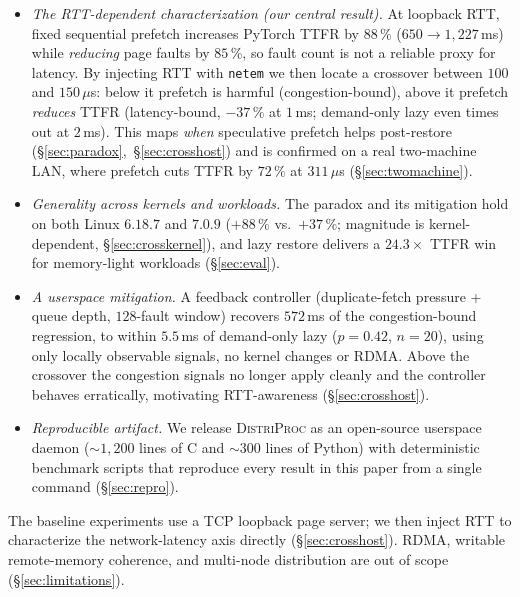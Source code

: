 \documentclass[journal]{IEEEtran}
\newcommand{\distriproc}{\textsc{DistriProc}\xspace}
\begin{document}
\begin{itemize}
\item \emph{The RTT-dependent characterization (our central result).} At
loopback RTT, fixed sequential prefetch increases PyTorch TTFR by $88\,\%$
($650 \to 1{,}227$\,ms) while \emph{reducing} page faults by $85\,\%$, so
fault count is not a reliable proxy for latency. By injecting RTT with
\texttt{netem} we then locate a crossover between $100$ and $150\,\mu$s: below
it prefetch is harmful (congestion-bound), above it prefetch \emph{reduces}
TTFR (latency-bound, $-37\,\%$ at $1$\,ms; demand-only lazy even times out
at $2$\,ms). This maps \emph{when} speculative prefetch helps post-restore
(\S\ref{sec:paradox},~\S\ref{sec:crosshost}) and is confirmed on a real
two-machine LAN, where prefetch cuts TTFR by $72\,\%$ at $311\,\mu$s
(\S\ref{sec:twomachine}).

\item \emph{Generality across kernels and workloads.} The paradox and its
mitigation hold on both Linux $6.18.7$ and $7.0.9$ ($+88\,\%$ vs.\
$+37\,\%$; magnitude is kernel-dependent, \S\ref{sec:crosskernel}), and lazy
restore delivers a $24.3\times$ TTFR win for memory-light workloads
(\S\ref{sec:eval}).

\item \emph{A userspace mitigation.} A feedback controller
(duplicate-fetch pressure + queue depth, $128$-fault window) recovers
$572$\,ms of the congestion-bound regression, to within $5.5$\,ms of
demand-only lazy ($p = 0.42$, $n = 20$), using only locally observable
signals, no kernel changes or RDMA. Above the crossover the congestion
signals no longer apply cleanly and the controller behaves erratically,
motivating RTT-awareness (\S\ref{sec:crosshost}).

\item \emph{Reproducible artifact.} We release \distriproc as an
open-source userspace daemon (${\sim}1{,}200$ lines of C and
${\sim}300$ lines of Python) with deterministic benchmark scripts that
reproduce every result in this paper from a single command
(\S\ref{sec:repro}).
\end{itemize}

The baseline experiments use a TCP loopback page server; we then inject RTT
to characterize the network-latency axis directly (\S\ref{sec:crosshost}).
RDMA, writable remote-memory coherence, and multi-node distribution are out
of scope (\S\ref{sec:limitations}).

\end{document}
